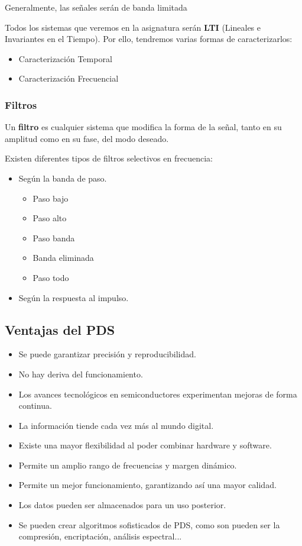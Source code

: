 \documentclass[a4paper]{book}
\begin{document}
Generalmente, las señales serán de banda limitada

Todos los sistemas que veremos en la asignatura serán \textbf{LTI} (Lineales e Invariantes en el Tiempo). Por ello, tendremos varias formas de caracterizarlos:
\begin{itemize}
	\item Caracterización Temporal
	\item Caracterización Frecuencial
\end{itemize}

\subsubsection{Filtros}

Un \textbf{filtro} es cualquier sistema que modifica la forma de la señal, tanto en su amplitud como en su fase, del modo deseado.

Existen diferentes tipos de filtros selectivos en frecuencia:
\begin{itemize}
	\item Según la banda de paso.
	      \begin{itemize}
		      \item Paso bajo
		      \item Paso alto
		      \item Paso banda
		      \item Banda eliminada
		      \item Paso todo
	      \end{itemize}
	\item Según la respuesta al impulso.
\end{itemize}

\subsection{Ventajas del PDS}
\begin{itemize}
	\item Se puede garantizar precisión y reproducibilidad.
	\item No hay deriva del funcionamiento.
	\item Los avances tecnológicos en semiconductores experimentan mejoras de forma continua.
	\item La información tiende cada vez más al mundo digital.
	\item Existe una mayor flexibilidad al poder combinar hardware y software.
	\item Permite un amplio rango de frecuencias y margen dinámico.
	\item Permite un mejor funcionamiento, garantizando así una mayor calidad.
	\item Los datos pueden ser almacenados para un uso posterior.
	\item Se pueden crear algoritmos sofisticados de PDS, como son pueden ser la compresión, encriptación, análisis espectral...
\end{itemize}
\end{document}
